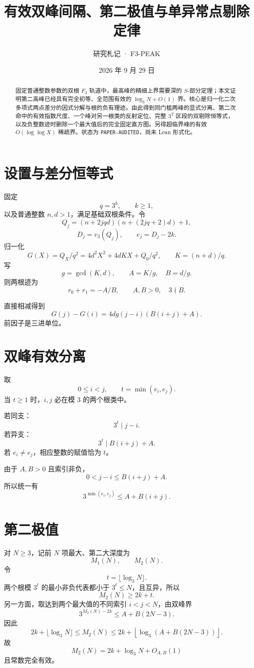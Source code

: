 \documentclass[11pt,a4paper]{ctexart}
\title{\bfseries 有效双峰间隔、第二极值与单异常点剔除定律}
\author{研究札记 · F3-PEAK}
\date{2026 年 9 月 29 日}
\begin{document}
\maketitle
\begin{abstract}
固定普通整数参数的双根 \(F_3\) 轨道中，最高峰的精细上界需要深的 \(S\)-部分定理；本文证明第二高峰已经具有完全初等、全范围有效的 \(\log_3N+O(1)\) 界。核心是归一化二次多项式两点差分的因式分解与根的负有理迹。由此得到同门槛两峰的显式分离、第二次命中的有效指数尺度、一个峰对另一根类的反射定位、完整 \(3^T\) 区段的双剔除恒等式，以及负整数迹时删除一个最大值后的完全固定直方图。另得超临界峰的有效 \(O(\log\log X)\) 稀疏界。状态为 \texttt{PAPER-AUDITED}，尚未 Lean 形式化。
\end{abstract}

\section{设置与差分恒等式}
固定
\[
q=3^k,\qquad k\ge1,
\]
以及普通整数 \(n,d>1\)，满足基础双根条件。令
\[
Q_j=(n+2jqd)(n+(2jq+2)d)+1,
\]
\[
D_j=v_3(Q_j),\qquad e_j=D_j-2k.
\]
归一化
\[
G(X)=Q_X/q^2
=
4d^2X^2+4dKX+Q_0/q^2,
\qquad K=(n+d)/q.
\]
写
\[
g=\gcd(K,d),\qquad
A=K/g,\quad B=d/g.
\]
则两根迹为
\[
r_0+r_1=-A/B,
\qquad A,B>0,\quad3\nmid B.
\]

直接相减得到
\[
\boxed{
G(j)-G(i)
=
4dg(j-i)(B(i+j)+A).
}
\]
前因子是三进单位。

\section{双峰有效分离}
取
\[
0\le i<j,\qquad
t=\min(e_i,e_j).
\]
当 \(t\ge1\) 时，\(i,j\) 必在模 \(3\) 的两个根类中。

若同支：
\[
\boxed{3^t\mid j-i.}
\]
若异支：
\[
\boxed{3^t\mid B(i+j)+A.}
\]
若 \(e_i\ne e_j\)，相应整数的赋值恰为 \(t\)。

由于 \(A,B>0\) 且索引非负，
\[
0<j-i\le B(i+j)+A.
\]
所以统一有
\[
\boxed{
3^{\min(e_i,e_j)}
\le
A+B(i+j).
}
\]

\section{第二极值}
对 \(N\ge3\)，记前 \(N\) 项最大、第二大深度为
\[
M_1(N),\qquad M_2(N).
\]
令
\[
t=\lfloor\log_3N\rfloor.
\]
两个根模 \(3^t\) 的最小非负代表都小于 \(3^t\le N\)，且互异，所以
\[
M_2(N)\ge2k+t.
\]
另一方面，取达到两个最大值的不同索引 \(i<j<N\)，由双峰界
\[
3^{M_2(N)-2k}
\le
A+B(2N-3).
\]
因此
\[
\boxed{
2k+\lfloor\log_3N\rfloor
\le
M_2(N)
\le
2k+
\left\lfloor
\log_3(A+B(2N-3))
\right\rfloor.
}
\]
故
\[
M_2(N)=2k+\log_3N+O_{A,B}(1)
\]
且常数完全有效。
\end{document}
